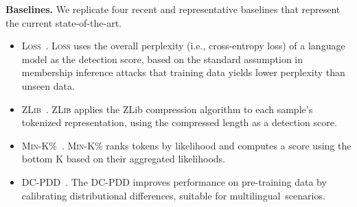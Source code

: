 

\textbf{Baselines.} We replicate four recent and representative baselines that represent the current state-of-the-art.

\begin{itemize}
    \item \textsc{Loss}~\cite{yeom2018privacy}. \textsc{Loss} uses the overall perplexity (i.e., cross-entropy loss) of a language model as the detection score, based on the standard assumption in membership inference attacks that training data yields lower perplexity than unseen data.
    \item \textsc{ZLib}~\cite{carlini2021extracting}. \textsc{ZLib} applies the ZLib compression algorithm to each sample's tokenized representation, using the compressed length as a detection score.
    \item \textsc{Min-K\%}~\cite{shi2023detecting}. \textsc{Min-K\%} ranks tokens by likelihood and computes a score using the bottom K based on their aggregated likelihoods. %
    \item \textsc{DC-PDD}~\cite{zhang2024pretraining}. The \textsc{DC-PDD} improves performance on pre-training data by calibrating distributional differences, suitable for multilingual~scenarios.
\end{itemize}




